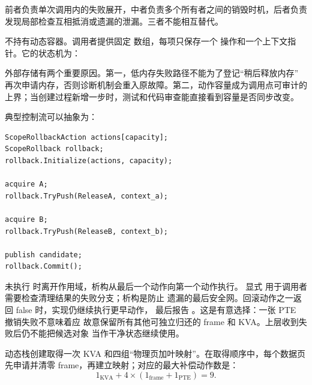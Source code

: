 前者负责单次调用内的失败展开，中者负责多个所有者之间的销毁时机，后者负责
发现局部检查互相抵消或遗漏的泄漏。三者不能相互替代。

 不持有动态容器。调用者提供固定
 数组，每项只保存一个
 操作和一个上下文指针。它的状态机为：

\begin{center}
\end{center}

外部存储有两个重要原因。第一，低内存失败路径不能为了登记“稍后释放内存”
再次申请内存，否则诊断机制会重入原故障。第二，动作容量成为调用点可审计的
上界；当创建过程新增一步时，测试和代码审查能直接看到容量是否同步改变。

典型控制流可以抽象为：

\begin{verbatim}
ScopeRollbackAction actions[capacity];
ScopeRollback rollback;
rollback.Initialize(actions, capacity);

acquire A;
rollback.TryPush(ReleaseA, context_a);

acquire B;
rollback.TryPush(ReleaseB, context_b);

publish candidate;
rollback.Commit();
\end{verbatim}

未执行  时离开作用域，析构从最后一个动作向第一个动作执行。
显式  用于调用者需要检查清理结果的失败分支；析构是防止
遗漏的最后安全网。回滚动作之一返回 false 时，实现仍继续执行更早动作，
最后报告 。这是有意选择：一张 PTE 撤销失败不意味着应
故意保留所有其他可独立归还的 frame 和 KVA。上层收到失败后仍不能把候选对象
当作干净状态继续使用。

动态栈创建取得一次 KVA 和四组“物理页加叶映射”。在取得顺序中，每个数据页
先申请并清零 frame，再建立映射；对应的最大补偿动作数是：
\[
  1_{\mathrm{KVA}}+
  4\times
  \left(1_{\mathrm{frame}}+1_{\mathrm{PTE}}\right)=9.
\]

